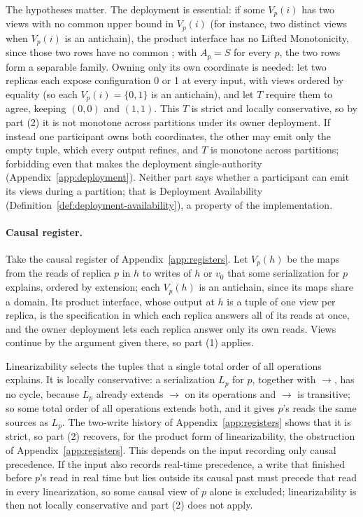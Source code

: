 The hypotheses matter.  The deployment is essential: if some $V_p(i)$ has two
views with no common upper bound in $V_p(i)$ (for instance, two distinct views
when $V_p(i)$ is an antichain), the product interface has no Lifted Monotonicity, since
those two rows have no common \outnoun; with $A_p=S$ for every $p$, the two
rows form a separable family.  Owning only its own coordinate is needed: let
two replicas each expose configuration 0 or 1 at every input, with views
ordered by equality (so each $V_p(i)=\{0,1\}$ is an antichain), and let $T$
require them to agree, keeping $(0,0)$ and $(1,1)$.  This $T$ is strict and
locally conservative, so by part (2) it is not monotone across partitions
under its owner deployment.  If instead one participant owns both coordinates,
the other may emit only the empty tuple, which every output refines, and $T$ is
monotone across partitions; forbidding even that makes the deployment
single-authority (Appendix~\ref{app:deployment}).  Neither part says whether a participant can emit
its views during a partition; that is Deployment Availability
(Definition~\ref{def:deployment-availability}), a property of the
implementation.

\paragraph{Causal register.}
Take the causal register of Appendix~\ref{app:registers}.  Let $V_p(h)$ be the
maps from the reads of replica $p$ in $h$ to writes of $h$ or $v_0$ that some
serialization for $p$ explains, ordered by extension; each $V_p(h)$ is an
antichain, since its maps share a domain.  Its product interface, whose output
at $h$ is a tuple of one view per replica, is the specification in which each
replica answers all of its reads at once, and the owner
deployment lets each replica answer only its own reads.  Views continue by the
argument given there, so part (1) applies.

Linearizability selects the tuples that a single total order of all
operations explains.  It is locally conservative: a serialization $L_p$ for
$p$, together with $\to$, has no cycle, because $L_p$ already extends $\to$ on
its operations and $\to$ is transitive; so some total order of all operations extends both, and it
gives $p$'s reads the same sources as $L_p$.  The two-write history of
Appendix~\ref{app:registers} shows that it is strict, so part (2) recovers, for the
product form of linearizability, the obstruction
of Appendix~\ref{app:registers}.  This depends on the input
recording only causal precedence.  If the input also records real-time
precedence, a write that finished before $p$'s read in real time but lies
outside its causal past must precede that read in every linearization, so some
causal view of $p$ alone is excluded; linearizability is then not locally
conservative and part (2) does not apply.
